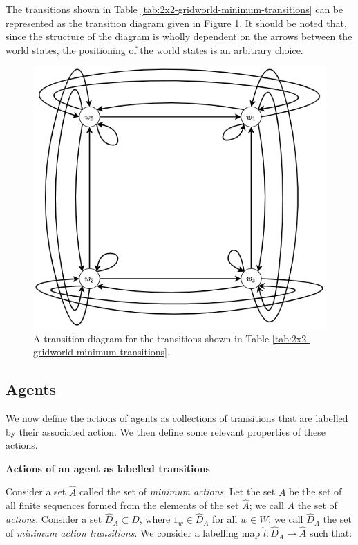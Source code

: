 The transitions shown in Table \ref{tab:2x2-gridworld-minimum-transitions} can be represented as the transition diagram given in Figure \ref{fig:2x2-cyclical-min-trans}.
It should be noted that, since the structure of the diagram is wholly dependent on the arrows between the world states, the positioning of the world states is an arbitrary choice.

\begin{figure}
    \centering
    \includegraphics[width=0.5\linewidth]{2MathematicalFramework/InitialFramework/Images/2x2-cyclical-min-trans.drawio.png}
    \caption{A transition diagram for the transitions shown in Table \ref{tab:2x2-gridworld-minimum-transitions}.}
    \label{fig:2x2-cyclical-min-trans}
\end{figure}

\subsection{Agents}
We now define the actions of agents as collections of transitions that are labelled by their associated action.
We then define some relevant properties of these actions.

\textbf{Actions of an agent as labelled transitions}\label{sec:Agent actions as labelled transitions}

Consider a set $\hat{A}$ called the set of \textit{minimum actions}.
Let the set $A$ be the set of all finite  sequences formed from the elements of the set $\hat{A}$; we call $A$ the set of \textit{actions}.
Consider a set $\hat{D}_{A} \subset D$, where $1_{w} \in \hat{D}_{A}$ for all $w \in W$; we call $\hat{D}_{A}$ the set of \textit{minimum action transitions}.
We consider a labelling map $\hat{l}: \hat{D}_{A} \to \hat{A}$ such that:

